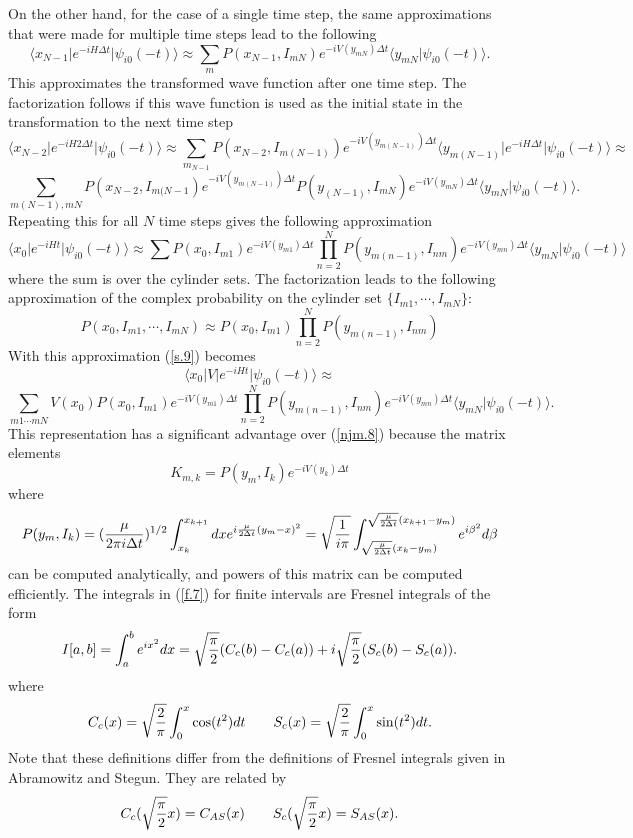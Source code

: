 \documentclass[aps,prc,reprint,noshowpacs,groupedaddress,onecolumn]{revtex4}
\def\beq{\begin{equation}}
\def\eeq{\end{equation}}
\begin{document}
On the other hand, for the case of a single time 
step, the same approximations that were made
for multiple time steps lead to the following
\beq
\langle x_{N-1} \vert e^{-iH \Delta t} \vert
\psi_{i0} (-t) \rangle  \approx
\sum_m P(x_{N-1},I_{mN}) e^{
  -i V(y_{mN}) \Delta t }
\langle y_{mN} \vert \psi_{i0} (-t)\rangle . 
\label{f.1}
\eeq
This approximates the transformed wave function after one time step.
The factorization follows if this wave function is used as the initial
state in the transformation to the next time step
\[
\langle x_{N-2} \vert e^{-iH 2\Delta t} \vert \psi_{i0} (-t) \rangle \approx
\sum_{m_{N-1}} P(x_{N-2},I_{m{(N-1)}}) e^{ -i V(y_{m{(N-1)}}) \Delta t
} \langle y_{m(N-1)} \vert e^{-iH \Delta t} \vert \psi_{i0} (-t) \rangle
\approx 
\]
\beq 
\sum_{m(N-1),{m{N}}} P(x_{N-2},I_{m({N-1}}) e^{-i
V(y_{m(N-1)}) \Delta t } P(y_{{(N-1)}} ,I_{mN}) e^{ -i
V(y_{mN}) \Delta t } \langle y_{mN} \vert \psi_{i0} (-t)\rangle . 
\label{f.2}
\eeq
Repeating this for all $N$ time steps gives the following approximation 
\beq
\langle x_0 \vert e^{-i H t} \vert \psi_{i0} (-t) \rangle \approx
\sum_{} P(x_0,I_{m1}) e^{ -i V(y_{m1}) \Delta t} 
\prod_{n=2}^N P(y_{m({n-1})},I_{nm}) e^{ -i V(y_{mn}) \Delta t}
\langle y_{mN} \vert \psi_{i0} (-t)\rangle 
\label{f.3}
\eeq
where the sum is over the cylinder sets.   The factorization
leads to the following approximation of the complex probability
on the cylinder set $\{I_{m1},\cdots , I_{mN}\}$:
\beq
P(x_0,I_{m1},\cdots ,I_{mN}) \approx 
P(x_0,I_{m1}) 
\prod_{n=2}^N P(y_{m({n-1})},I_{nm})
\label{f.4}
\eeq
With this approximation (\ref{s.9}) becomes 
\[
\langle x_0 \vert V   \vert e^{-i H t} \vert \psi_{i0} (-t) \rangle \approx
\]
\beq
\sum_{m1 \cdots mN}
V(x_0) 
P(x_0,I_{m1}) e^{ -i V(y_{m1}) \Delta t} 
\prod_{n=2}^N P(y_{m({n-1})},I_{nm}) e^{ -i V(y_{mn}) \Delta t}
\langle y_{mN} \vert \psi_{i0} (-t)\rangle . 
\label{f.5}
\eeq
This representation has a significant advantage over (\ref{njm.8}) 
because the matrix elements
\beq
K_{m,k} =
P(y_{m},I_{k}) e^{ -i V(y_{k}) \Delta t}
\label{f.6}
\eeq
where
\beq
P(y_{m},I_{k}) = 
({\mu \over 2 \pi i \Delta t})^{1/2}
\int_{x_k}^{x_{k+1}} dx
e^{
i {\mu \over 2\Delta t} (y_{m}-x)^2} 
=
\sqrt{{1  \over i \pi }}
\int_{\sqrt{{\mu \over 2\Delta t}}(x_k-y_m)}^{\sqrt{{\mu \over 2\Delta t}}(
x_{k+1}-y_m)}
e^{ 
i \beta^2} d\beta
\label{f.7}
\eeq
can  be computed analytically,  and  powers  of  this matrix  can  be
computed efficiently.  The integrals in (\ref{f.7}) for finite intervals 
are Fresnel integrals of the form
\beq
I[a,b] = \int_a^b e^{ix^2} dx =
\sqrt{\pi \over 2} (C_{c}(b)- C_{c}(a))
+i \sqrt{\pi \over 2} (S_{c}(b)- S_{c}(a)) .
\label{f.8}
\eeq
where
\beq
C_c(x) = \sqrt{{2 \over \pi}} \int_0^x \cos(t^2) dt
\qquad
S_c(x) = \sqrt{{2 \over \pi}} \int_0^x \sin(t^2) dt .
\label{f.9}
\eeq
Note that these definitions differ from the definitions of
Fresnel integrals given in \cite{Abramowitz} Abramowitz and Stegun.
They are related by
\beq
C_c (\sqrt{{\pi \over 2}}x) = C_{AS} (x)
\qquad
S_c (\sqrt{{\pi \over 2}}x) = S_{AS} (x).
\label{f.10}
\eeq
\end{document}
